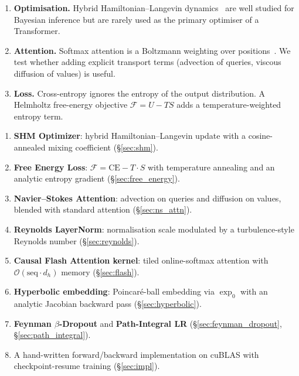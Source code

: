 \documentclass[11pt,a4paper]{article}
\newcommand{\calF}{\mathcal{F}}
\newcommand{\CE}{\mathrm{CE}}
\begin{document}
\begin{enumerate}[label=(\roman*)]
  \item \textbf{Optimisation.}
    Hybrid Hamiltonian--Langevin dynamics~\citep{neal2011mcmc,ma2015complete}
    are well studied for Bayesian inference but are rarely used as the
    primary optimiser of a Transformer.
  \item \textbf{Attention.}
    Softmax attention is a Boltzmann weighting over positions~\citep{ramsauer2020hopfield}.
    We test whether adding explicit transport terms (advection of queries,
    viscous diffusion of values) is useful.
  \item \textbf{Loss.}
    Cross-entropy ignores the entropy of the output distribution. A
    Helmholtz free-energy objective $\calF = U - TS$ adds a
    temperature-weighted entropy term.
\end{enumerate}

\begin{tcolorbox}[colback=blue!3, colframe=blue!40!black,
                  title=\textbf{Contributions}, breakable]
\begin{enumerate}
  \item \textbf{SHM Optimizer}: hybrid Hamiltonian--Langevin update with
        a cosine-annealed mixing coefficient (\S\ref{sec:shm}).
  \item \textbf{Free Energy Loss}: $\calF = \CE - T\cdot S$ with
        temperature annealing and an analytic entropy gradient
        (\S\ref{sec:free_energy}).
  \item \textbf{Navier--Stokes Attention}: advection on queries and
        diffusion on values, blended with standard attention
        (\S\ref{sec:ns_attn}).
  \item \textbf{Reynolds LayerNorm}: normalisation scale modulated by a
        turbulence-style Reynolds number (\S\ref{sec:reynolds}).
  \item \textbf{Causal Flash Attention kernel}: tiled online-softmax
        attention with $\mathcal{O}(\text{seq}\cdot d_h)$ memory
        (\S\ref{sec:flash}).
  \item \textbf{Hyperbolic embedding}: Poincar\'e-ball embedding via
        $\exp_0$ with an analytic Jacobian backward pass
        (\S\ref{sec:hyperbolic}).
  \item \textbf{Feynman $\beta$-Dropout} and \textbf{Path-Integral LR}
        (\S\ref{sec:feynman_dropout}, \S\ref{sec:path_integral}).
  \item A hand-written forward/backward implementation on cuBLAS with
        checkpoint-resume training (\S\ref{sec:impl}).
\end{enumerate}
\end{tcolorbox}
\end{document}
